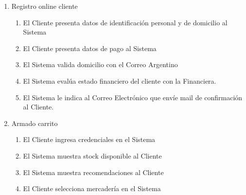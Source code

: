 \begin{enumerate}
  \item Registro online cliente
  \begin{enumerate}
    \item El Cliente presenta datos de identificación personal y de domicilio al Sistema \label{itm:f-cliente-datos-personal-sistema}
    \item El Cliente presenta datos de pago al Sistema \label{itm:f-cliente-datos-pago-sistema}
    \item El Sistema valida domicilio con el Correo Argentino \label{itm:f-sistema-valida-correoargentino}
    \item El Sistema evalúa estado financiero del cliente con la Financiera. \label{itm:f-sistema-evalua-financiera}
    \item El Sistema le indica al Correo Electrónico que envíe mail de confirmación al Cliente. \label{itm:f-sistema-confirmacion-correoelectronico}
  \end{enumerate}

  \item Armado carrito
  \begin{enumerate}
    \item El Cliente ingresa credenciales en el Sistema \label{itm:f-cliente-autentica-sistema}
    \item El Sistema muestra stock disponible al Cliente \label{itm:f-sistema-muestra-stock-cliente}
    \item El Sistema muestra recomendaciones al Cliente \label{itm:f-sistema-muestra-recomendaciones-cliente}
    \item El Cliente selecciona mercadería en el Sistema \label{itm:f-cliente-elige-mercaderia-sistema}
  \end{enumerate}
    

\end{enumerate}
